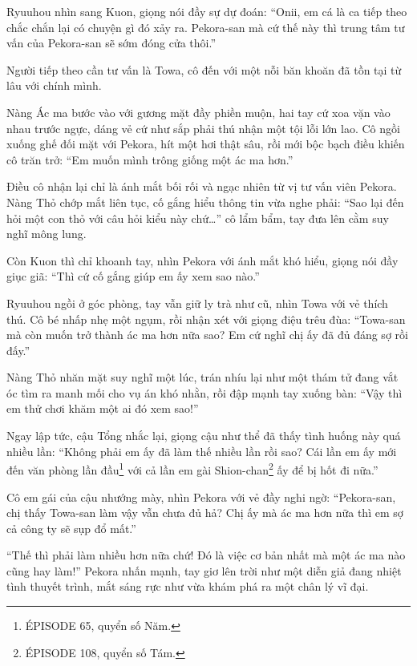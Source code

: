 \documentclass[../main.tex]{subfiles}
\begin{document}
Ryuuhou nhìn sang Kuon, giọng nói đầy sự dự đoán: ``Onii, em cá là ca tiếp theo chắc chắn lại có chuyện gì đó xảy ra. Pekora-san mà cứ thế này thì trung tâm tư vấn của Pekora-san sẽ sớm đóng cửa thôi.''

\ct

Người tiếp theo cần tư vấn là Towa, cô đến với một nỗi băn khoăn đã tồn tại từ lâu với chính mình.

Nàng Ác ma bước vào với gương mặt đầy phiền muộn, hai tay cứ xoa vặn vào nhau trước ngực, dáng vẻ cứ như sắp phải thú nhận một tội lỗi lớn lao. Cô ngồi xuống ghế đối mặt với Pekora, hít một hơi thật sâu, rồi mới bộc bạch điều khiến cô trăn trở: ``Em muốn mình trông giống một ác ma hơn.''

Điều cô nhận lại chỉ là ánh mắt bối rối và ngạc nhiên từ vị tư vấn viên Pekora. Nàng Thỏ chớp mắt liên tục, cố gắng hiểu thông tin vừa nghe phải: ``Sao lại đến hỏi một con thỏ với câu hỏi kiểu này chứ\dots'' cô lẩm bẩm, tay đưa lên cằm suy nghĩ mông lung.

Còn Kuon thì chỉ khoanh tay, nhìn Pekora với ánh mắt khó hiểu, giọng nói đầy giục giã: ``Thì cứ cố gắng giúp em ấy xem sao nào.''

Ryuuhou ngồi ở góc phòng, tay vẫn giữ ly trà như cũ, nhìn Towa với vẻ thích thú. Cô bé nhấp nhẹ một ngụm, rồi nhận xét với giọng điệu trêu đùa: ``Towa-san mà còn muốn trở thành ác ma hơn nữa sao? Em cứ nghĩ chị ấy đã đủ đáng sợ rồi đấy.''


Nàng Thỏ nhăn mặt suy nghĩ một lúc, trán nhíu lại như một thám tử đang vắt óc tìm ra manh mối cho vụ án khó nhằn, rồi đập mạnh tay xuống bàn: ``Vậy thì em thử chơi khăm một ai đó xem sao!''

Ngay lập tức, cậu Tổng nhắc lại, giọng cậu như thể đã thấy tình huống này quá nhiều lần: ``Không phải em ấy đã làm thế nhiều lần rồi sao? Cái lần em ấy mới đến văn phòng lần đầu\footnote{{\flaregothic ÉPISODE 65}, quyển số Năm.} với cả lần em gài Shion-chan\footnote{{\flaregothic ÉPISODE 108}, quyển số Tám.} ấy để bị hốt đi nữa.''

Cô em gái của cậu nhướng mày, nhìn Pekora với vẻ đầy nghi ngờ: ``Pekora-san, chị thấy Towa-san làm vậy vẫn chưa đủ hả? Chị ấy mà ác ma hơn nữa thì em sợ cả công ty sẽ sụp đổ mất.''

``Thế thì phải làm nhiều hơn nữa chứ! Đó là việc cơ bản nhất mà một ác ma nào cũng hay làm!'' Pekora nhấn mạnh, tay giơ lên trời như một diễn giả đang nhiệt tình thuyết trình, mắt sáng rực như vừa khám phá ra một chân lý vĩ đại.
\end{document}
